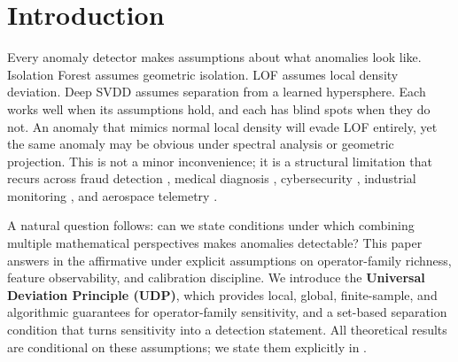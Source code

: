 \documentclass{article}
\DeclareMathOperator{\erf}{erf}
\begin{document}
\begin{abstract}
We also present the \textbf{GravityEngine}, an N-body scoring algorithm whose force potentials we derive in closed form. The attraction potential involves the error function $\erf(r/\sigma)$. With backtracking line-search, the energy decreases monotonically at every observed iteration; the descent guarantee holds conditional on the line-search finding a step within the halving budget. Empirically, UDL with experimental operator stacks achieves mean AUC $0.960$ across five benchmarks (two synthetic, three ODDS datasets), ranking third among all tested methods---within $0.007$ of $k$-NN---under a single hyperparameter set with zero learnable parameters. The supervised UDL-QDA-Magnified variant reaches $0.895$ mean AUC on the same five benchmarks. GravityEngine reaches AUC $0.899$ on mammography with empirically verified monotone energy decrease (14/14 iteration steps). We numerically verify the theorem conditions on three independent ODDS benchmarks via Monte Carlo checks and observe no violations in our samples. Code is available at \url{https://github.com/segetii/fintech}.
\end{abstract}

\section{Introduction}
\label{sec:introduction}

Every anomaly detector makes assumptions about what anomalies look like. Isolation Forest \citep{liu2008isolation} assumes geometric isolation. LOF \citep{breunig2000lof} assumes local density deviation. Deep SVDD \citep{ruff2018deep} assumes separation from a learned hypersphere. Each works well when its assumptions hold, and each has blind spots when they do not. An anomaly that mimics normal local density will evade LOF entirely, yet the same anomaly may be obvious under spectral analysis or geometric projection. This is not a minor inconvenience; it is a structural limitation that recurs across fraud detection \citep{ahmed2016survey}, medical diagnosis \citep{fernando2021deep}, cybersecurity \citep{chandola2009anomaly}, industrial monitoring \citep{pang2021deep}, and aerospace telemetry \citep{hundman2018detecting}.

A natural question follows: can we state conditions under which combining multiple mathematical perspectives makes anomalies detectable? This paper answers in the affirmative under explicit assumptions on operator-family richness, feature observability, and calibration discipline. We introduce the \textbf{Universal Deviation Principle (UDP)}, which provides local, global, finite-sample, and algorithmic guarantees for operator-family sensitivity, and a set-based separation condition that turns sensitivity into a detection statement. All theoretical results are conditional on these assumptions; we state them explicitly in .
\end{document}
